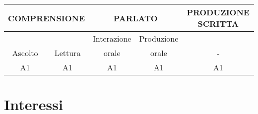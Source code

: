 \documentclass[11pt,a4paper,sans]{moderncv} %
\begin{document}
{%
	\centering
	\begin{tabular}{*{5}{c}}
		\toprule
		\multicolumn{2}{c}{\textcolor{cvcolor}{COMPRENSIONE}} & \multicolumn{2}{c}{\textcolor{cvcolor}{PARLATO}}          & \textcolor{cvcolor}{PRODUZIONE SCRITTA} \\ \midrule
		& & \textcolor{cvcolor}{Interazione} & \textcolor{cvcolor}{Produzione} & \\
		\textcolor{cvcolor}{Ascolto}         & \textcolor{cvcolor}{Lettura}        &  \textcolor{cvcolor}{orale} &  \textcolor{cvcolor}{orale} & -       \\             A1                & A1              & A1                 & A1                & A1      \\ \bottomrule
	\end{tabular}%
}{}


\section{Interessi}

\renewcommand{\listitemsymbol}{-~} %


\end{document}
